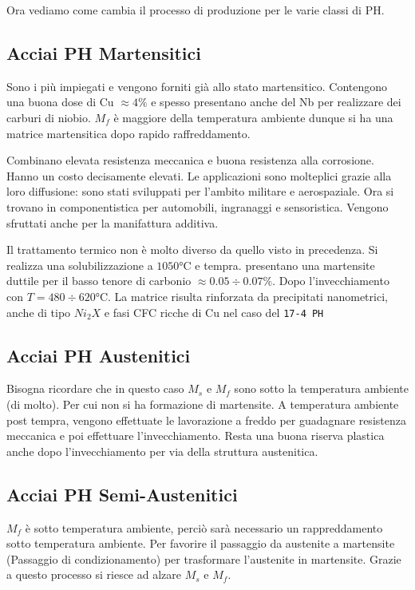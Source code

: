 Ora vediamo come cambia il processo di produzione per le varie classi di \ac{PH}.

\subsection{Acciai PH Martensitici}
Sono i più impiegati e vengono forniti già allo stato martensitico.
Contengono una buona dose di Cu $\approx 4\%$ e spesso presentano anche del Nb per realizzare dei carburi di niobio.
$M_f$ è maggiore della temperatura ambiente dunque si ha una matrice martensitica dopo rapido raffreddamento.

Combinano elevata resistenza meccanica e buona resistenza alla corrosione.
Hanno un costo decisamente elevati.
Le applicazioni sono molteplici grazie alla loro diffusione: sono stati sviluppati per l'ambito militare e aerospaziale. Ora si trovano in componentistica per automobili, ingranaggi e sensoristica. Vengono sfruttati anche per la manifattura additiva.

Il trattamento termico non è molto diverso da quello visto in precedenza.
Si realizza una solubilizzazione a $1050\unit{\celsius}$ e tempra. presentano una martensite duttile per il basso tenore di carbonio $\approx 0.05 \div 0.07\%$.
Dopo l'invecchiamento con $T = 480 \div 620\unit{\celsius}$. La matrice risulta rinforzata da precipitati nanometrici, anche di tipo $Ni_2X$ e fasi CFC ricche di Cu nel caso del \texttt{17-4 PH}

\subsection{Acciai PH Austenitici}
Bisogna ricordare che in questo caso $M_s$ e $M_f$ sono sotto la temperatura ambiente (di molto). Per cui non si ha formazione di martensite.
A temperatura ambiente post tempra, vengono effettuate le lavorazione a freddo per guadagnare resistenza meccanica e poi effettuare l'invecchiamento.
Resta una buona riserva plastica anche dopo l'invecchiamento per via della struttura austenitica.

\subsection{Acciai PH Semi-Austenitici}
$M_f$ è sotto temperatura ambiente, perciò sarà necessario un rappreddamento sotto temperatura ambiente.
Per favorire il passaggio da austenite a martensite (Passaggio di condizionamento) per trasformare l'austenite in martensite.
Grazie a questo processo si riesce ad alzare $M_s$ e $M_f$.

